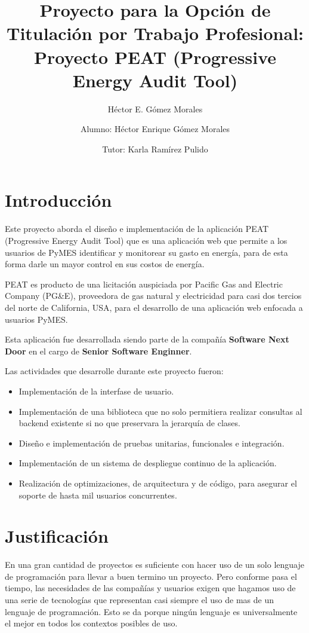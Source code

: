 \documentclass{article}
\author{Héctor E. Gómez Morales}
\title{Proyecto para la Opción de Titulación por Trabajo Profesional: \\
  Proyecto PEAT (Progressive Energy Audit Tool)}
\begin{document}
\author{ Alumno: Héctor Enrique Gómez Morales \and
  Tutor: Karla Ramírez Pulido}
\maketitle
\section{Introducción}
Este proyecto aborda el diseño e implementación de la aplicación
PEAT (Progressive Energy Audit Tool) que es una aplicación web que
permite a los usuarios de PyMES identificar y monitorear su gasto en
energía, para de esta forma darle un mayor control en sus costos de
energía.

PEAT es producto de una licitación auspiciada por Pacific Gas and
Electric Company (PG\&E), proveedora de gas natural y electricidad
para casi dos tercios del norte de California, USA, para
el desarrollo de una aplicación web enfocada a usuarios PyMES.

Esta aplicación fue desarrollada siendo parte de la compañía \textbf{Software Next Door} en el cargo de \textbf{Senior Software Enginner}.

Las actividades que desarrolle durante este proyecto fueron:
\begin{itemize}
\item Implementación de la interfase de usuario.
\item Implementación de una biblioteca que no solo permitiera realizar consultas
  al backend existente si no que preservara la jerarquía de clases.
\item Diseño e implementación de pruebas unitarias, funcionales e integración.
\item Implementación de un sistema de despliegue continuo de la aplicación.
\item Realización de optimizaciones, de arquitectura y de código, para asegurar el soporte de hasta mil usuarios concurrentes.
\end{itemize}

\section{Justificación}
En una gran cantidad de proyectos es suficiente
con hacer uso de un solo lenguaje de programación para llevar a buen
termino un proyecto. Pero conforme pasa el tiempo, las necesidades
de las compañías y usuarios exigen que hagamos uso de una serie de
tecnologías que representan casi siempre el uso de mas de un lenguaje
de programación. Esto se da porque ningún lenguaje es universalmente
el mejor en todos los contextos posibles de uso.
\end{document}
